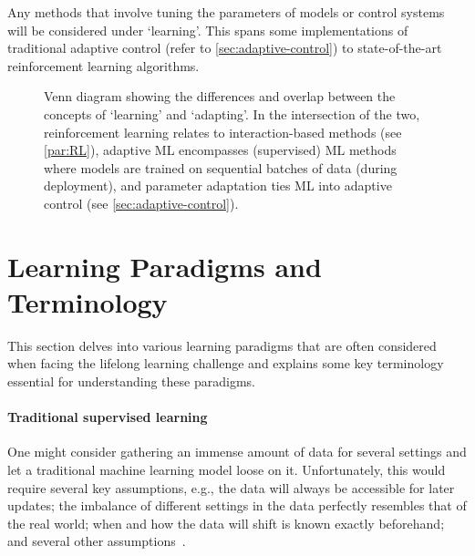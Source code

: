 Any methods that involve tuning the parameters of models or control systems will be considered under `learning'.
This spans some implementations of traditional adaptive control (refer to \cref{sec:adaptive-control}) to state-of-the-art reinforcement learning algorithms.


\begin{figure}[!htb]
    \begin{center}
        \def\svgwidth{0.35\textwidth}
        \fontsize{7pt}{1pt}\selectfont
    \end{center}
    \captionsetup{width=0.8\textwidth}
    \caption{Venn diagram showing the differences and overlap between the concepts of `learning' and `adapting'.
    In the intersection of the two, reinforcement learning relates to interaction-based methods (see \cref{par:RL}), adaptive ML encompasses (supervised) ML methods where models are trained on sequential batches of data (during deployment), and parameter adaptation ties ML into adaptive control (see \cref{sec:adaptive-control}).}
    \label{fig:venn}
\end{figure}

\section{Learning Paradigms and Terminology}\label{sec:paradigms}
This section delves into various learning paradigms that are often considered when facing the lifelong learning challenge and explains some key terminology essential for understanding these paradigms.

\paragraph{Traditional supervised learning}\label{par:traditional-learning}
One might consider gathering an immense amount of data for several settings and let a traditional machine learning model loose on it.
Unfortunately, this would require several key assumptions, e.g., the data will always be accessible for later updates; the imbalance of different settings in the data perfectly resembles that of the real world; when and how the data will shift is known exactly beforehand; and several other assumptions~\cite{Lesort2020}.

